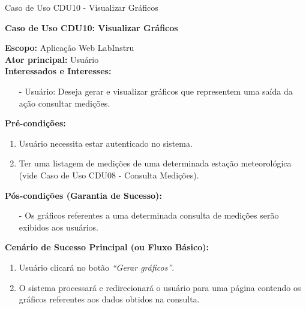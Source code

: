\begin{quadro}[H]
	\centering
	\caption{Caso de Uso CDU10 - Visualizar Gráficos}

	\begin{framed}

		\textbf{Caso de Uso CDU10: Visualizar Gráficos}\\

		\begin{flushleft}

		\textbf{Escopo:} Aplicação Web LabInstru\\

		\textbf{Ator principal:} Usuário\\

		\textbf{Interessados e Interesses:}
		\begin{itemize}
			\item[-] Usuário: Deseja gerar e visualizar gráficos que representem uma saída da ação consultar medições.
		\end{itemize}

		\textbf{Pré-condições:}\\
			 \begin{enumerate}
			 	\item{Usuário necessita estar autenticado no sistema.}
			 	\item{Ter uma listagem de medições de uma determinada estação meteorológica (vide Caso de Uso CDU08 - Consulta Medições).}
			 \end{enumerate}

		\textbf{Pós-condições (Garantia de Sucesso):}
		\begin{itemize}
			\item[-] Os gráficos referentes a uma determinada consulta de medições serão exibidos aos usuários.
		\end{itemize}

		\textbf{Cenário de Sucesso Principal (ou Fluxo Básico):}\\
			\begin{enumerate}
			 	\item{Usuário clicará no botão \textit{``Gerar gráficos''}.}
			 	\item{O sistema processará e redirecionará o usuário para uma página contendo os gráficos referentes aos dados obtidos na consulta.}
			 \end{enumerate}

		\end{flushleft}

	\end{framed}

\end {quadro} %

